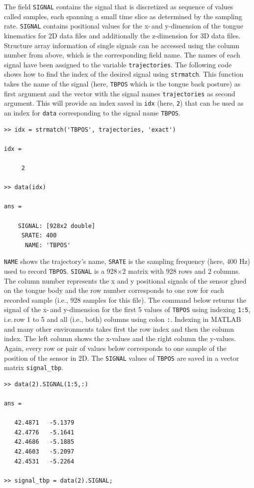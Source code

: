\documentclass[a4paper, 12pt]{article}
\begin{document}
The field \texttt{SIGNAL} contains the signal that is discretized as sequence of values called samples, each spanning a small time slice as determined by the sampling rate. \texttt{SIGNAL} contains positional values for the x-\,and y-dimension of the tongue kinematics for 2D data files and additionally the z-dimension for 3D data files. Structure array information of single signals can be accessed using the column number from above, which is the corresponding field name. The names of each signal have been assigned to the variable \texttt{trajectories}. The following code shows how to find the index of the desired signal using \texttt{strmatch}. This function takes the name of the signal (here, \texttt{TBPOS} which is the tongue back posture) as first argument and the vector with the signal names \texttt{trajectories} as second argument. This will provide an index saved in \texttt{idx} (here, \texttt{2}) that can be used as an index for \texttt{data} corresponding to the signal name \texttt{TBPOS}. 

\begin{verbatim}
>> idx = strmatch('TBPOS', trajectories, 'exact')

idx =

     2

>> data(idx)

ans = 

    SIGNAL: [928x2 double]
     SRATE: 400
      NAME: 'TBPOS'
\end{verbatim} 

\texttt{NAME} shows the trajectory's name, \texttt{SRATE} is the sampling frequency (here, 400 Hz) used to record \texttt{TBPOS}. \texttt{SIGNAL} is a 928$\times$2 matrix with 928 rows and 2 columns. The column number represents the x and y positional signals of the sensor glued on the tongue body and the row number corresponds to one row for each recorded sample (i.e., 928 samples for this file). The command below returns the signal of the x-\,and y-dimension for the first 5 values of \texttt{TBPOS} using indexing \texttt{1:5}, i.e.\,row 1 to 5 and all (i.e., both) columns using colon \texttt{:}. Indexing in MATLAB and many other environments takes first the row index and then the column index. The left column shows the x-values and the right column the y-values. Again, every row or pair of values below corresponds to one sample of the position of the sensor in 2D. The \texttt{SIGNAL} values of \texttt{TBPOS} are saved in a vector matrix \texttt{signal\_tbp}.

\begin{verbatim}
>> data(2).SIGNAL(1:5,:)

ans =

   42.4871   -5.1379
   42.4776   -5.1641
   42.4686   -5.1885
   42.4603   -5.2097
   42.4531   -5.2264

>> signal_tbp = data(2).SIGNAL;
\end{verbatim}
\end{document}
